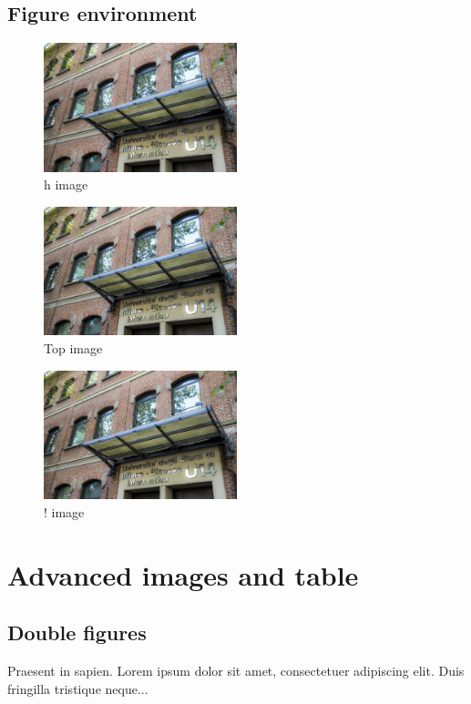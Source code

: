 \documentclass[a4paper, oneside]{book}
\begin{document}
\section{Figure environment}

\begin{figure}[h]
\includegraphics[width=0.5\textwidth, inner]{u14}
\caption{h image}
\label{fig:figure4}
\end{figure}

\begin{figure}[t]
\includegraphics[width=0.5\textwidth, inner]{u14}
\caption{Top image}
\label{fig:figure2}
\end{figure}

\begin{figure}[!]
\includegraphics[width=0.5\textwidth, inner]{u14}
\caption{! image}
\label{fig:figure3}
\end{figure}

\chapter{Advanced images and table}

\section{Double figures}
Praesent in sapien. Lorem ipsum dolor sit amet, consectetuer adipiscing elit. Duis fringilla tristique neque...
\end{document}
